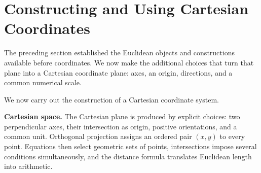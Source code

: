 \section{Constructing and Using Cartesian Coordinates}

The preceding section established the Euclidean objects and constructions available before coordinates. We now make the additional choices that turn that plane into a Cartesian coordinate plane: axes, an origin, directions, and a common numerical scale.

We now carry out the construction of a Cartesian coordinate system.












\noindent\textbf{Cartesian space.} The Cartesian plane is produced by explicit choices: two perpendicular axes, their intersection as origin, positive orientations, and a common unit. Orthogonal projection assigns an ordered pair $(x,y)$ to every point. Equations then select geometric sets of points, intersections impose several conditions simultaneously, and the distance formula translates Euclidean length into arithmetic.
